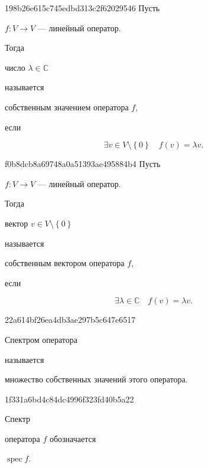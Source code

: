 \begin{note}{198b26e615c745edbd313c2f62029546}
    Пусть \begin{icloze}{3}\( f : V \to V \) --- линейный оператор.\end{icloze} Тогда \begin{icloze}{1}число \( \lambda \in \mathbb C  \)\end{icloze} называется \begin{icloze}{2}собственным значением оператора \( f \),\end{icloze} если
    \begin{icloze}{1}
        \[
            \exists v \in V \setminus \left\{ 0 \right\} \quad f(v) = \lambda v.
        \]
    \end{icloze}
\end{note}

\begin{note}{f0b8dcb8a69748a0a51393ae495884b4}
    Пусть \begin{icloze}{3}\( f : V \to V \) --- линейный оператор.\end{icloze} Тогда \begin{icloze}{1}вектор \( v \in V \setminus \left\{ 0 \right\} \)\end{icloze} называется \begin{icloze}{2}собственным вектором оператора \( f \),\end{icloze} если
    \begin{icloze}{1}
        \[
            \exists \lambda \in \mathbb C \quad f(v) = \lambda v.
        \]
    \end{icloze}
\end{note}

\begin{note}{22a614bf26ea4db3ae297b5c647e6517}
    \begin{icloze}{2}Спектром оператора\end{icloze} называется \begin{icloze}{1}множество собственных значений этого оператора.\end{icloze}
\end{note}

\begin{note}{1f331a6bd4c84dc4996f323fd40b5a22}
    \begin{icloze}{2}Спектр\end{icloze} оператора \( f \) обозначается \begin{icloze}{1}\( \operatorname{spec} f \).\end{icloze}
\end{note}

